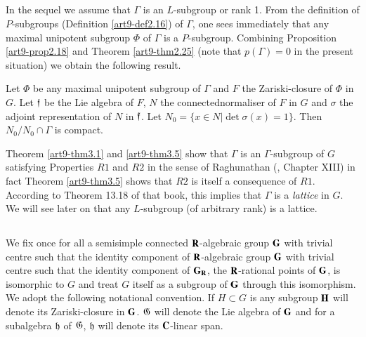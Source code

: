 \subsection{}\label{art9-subsec3.4}
In the sequel we assume that $\Gamma$ is an $L$-subgroup or rank 1. From the definition of $P$-subgroups (Definition \ref{art9-def2.16}) of $\Gamma$, one sees immediately that any maximal unipotent subgroup $\Phi$ of $\Gamma$ is a $P$-subgroup. Combining Proposition \ref{art9-prop2.18} and Theorem \ref{art9-thm2.25} (note that $p(\Gamma) = 0$ in the present situation) we obtain the following result.

\setcounter{definition}{4}
\begin{theorem}\label{art9-thm3.5}
Let $\Phi$ be any maximal unipotent subgroup of $\Gamma$ and $F$ the Zariski-closure of $\Phi$ in $G$. Let $\mathfrak{f}$ be the Lie algebra of $F$, $N$ the connected\pageoriginale normaliser of $F$ in $G$ and $\sigma$ the adjoint representation of $N$ in $\mathfrak{f}$. Let $N_0 = \{x \in N \big| \det \sigma (x) =1\}$. Then $N_0 / N_0 \cap \Gamma$ is compact.
\end{theorem}

\begin{remark}\label{art9-remark3.6}
Theorem \ref{art9-thm3.1} and \ref{art9-thm3.5} show that $\Gamma$ is an $\Gamma$-subgroup of $G$ satisfying Properties $R1$ and $R2$ in the sense of Raghunathan (\cite{art9-key1}, Chapter XIII) in fact Theorem \ref{art9-thm3.5} shows that $R2$ is itself a consequence of $R1$. According to Theorem 13.18 of that book, this implies that $\Gamma$ is a \textit{lattice} in $G$. We will see later on that any $L$-subgroup (of arbitrary rank) is a lattice.
\end{remark}

\setcounter{subsection}{6}
\subsection{}\label{art9-subsec3.7}
We fix once for all a semisimple connected $\mathbf{R}$-algebraic group $\mathbf{G}$ with trivial centre such that the identity component of $\mathbf{R}$-algebraic group $\mathbf{G}$ with trivial centre such that the identity component of $\mathbf{G}_{\mathbf{R}}$, the $\mathbf{R}$-rational points of $\mathbf{G}$, is isomorphic to $G$ and treat $G$ itself as a subgroup of $\mathbf{G}$ through this isomorphism. We adopt the following notational convention. If $H \subset G$ is any subgroup $\mathbf{H}$ will denote its Zariski-closure in $\mathbf{G}$. $\mathfrak{G}$ will denote the Lie algebra of $\mathbf{G}$ and for a subalgebra $\mathfrak{h}$ of $\mathfrak{G}$, $\mathfrak{h}$ will denote its $\mathbf{C}$-linear span.

